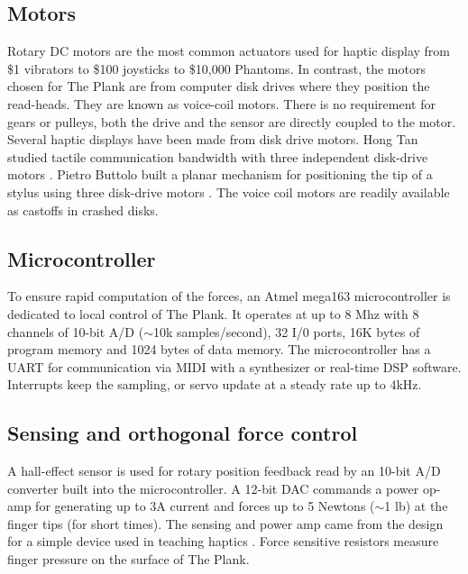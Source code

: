 \subsection{Motors}

Rotary DC motors are the most common actuators used for haptic display from \$1 vibrators to \$100 joysticks to \$10,000 Phantoms. In contrast, the motors chosen for The Plank are from computer disk drives where they position the read-heads. They are known as voice-coil motors. There is no requirement for gears or pulleys, both the drive and the sensor are directly coupled to the motor. Several haptic displays have been made from disk drive motors. Hong Tan studied tactile communication bandwidth with three independent disk-drive motors \cite{Tan:1996}. Pietro Buttolo built a planar mechanism for positioning the tip of a stylus using three disk-drive motors \cite{Buttolo:1995}. The voice coil motors are readily available as castoffs in crashed disks.

\subsection{Microcontroller}
\label{Verplank:sub:3_2}
To ensure rapid computation of the forces, an Atmel mega163 microcontroller is dedicated to local control of The Plank. %
It operates at up to 8 Mhz with 8 channels of 10-bit A/D ($\sim$10k samples/second), 32 I/0 ports, 16K bytes of program memory and 1024 bytes of data memory. The microcontroller has a UART for communication via MIDI with a synthesizer or real-time DSP software. Interrupts keep the sampling, or servo update at a steady rate up to 4kHz.

\subsection{Sensing and orthogonal force control}
\label{Verplank:sub:3_3}
A hall-effect sensor is used for rotary position feedback read by an 10-bit A/D converter built into the microcontroller. A 12-bit DAC commands a power op-amp for generating up to 3A current and forces up to 5 Newtons ($\sim$1 lb) at the finger tips (for short times). The sensing and power amp came from the design for a simple device used in teaching haptics \cite{Richard:1997}. Force sensitive resistors measure finger pressure on the surface of The Plank.

